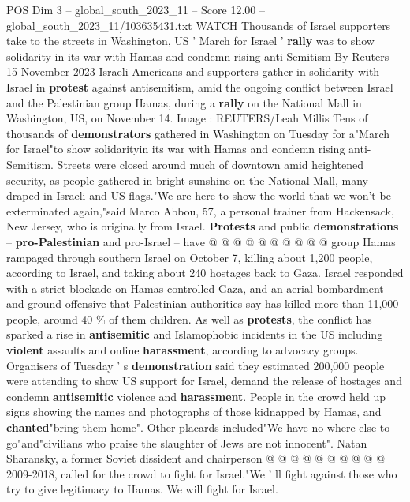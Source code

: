\begin{textsample}{POS Dim 3 – global\_south\_2023\_11 – Score 12.00 – global\_south\_2023\_11/103635431.txt}  \label{ex:f3_pos_350}
WATCH Thousands of Israel supporters take to the streets in Washington, US ' March for Israel ' \textbf{rally} was to show solidarity in its war with Hamas and condemn rising anti-Semitism By Reuters - 15 November 2023 Israeli Americans and supporters gather in solidarity with Israel in \textbf{protest} against antisemitism, amid the ongoing conflict between Israel and the Palestinian group Hamas, during a \textbf{rally} on the National Mall in Washington, US, on November 14.
Image : REUTERS/Leah Millis Tens of thousands of \textbf{demonstrators} gathered in Washington on Tuesday for a"March for Israel"to show solidarityin its war with Hamas and condemn rising anti-Semitism.
Streets were closed around much of downtown amid heightened security, as people gathered in bright sunshine on the National Mall, many draped in Israeli and US flags."We are here to show the world that we won't be exterminated again,"said Marco Abbou, 57, a personal trainer from Hackensack, New Jersey, who is originally from Israel. \textbf{Protests} and public \textbf{demonstrations} -- \textbf{pro-Palestinian} and pro-Israel -- have @ @ @ @ @ @ @ @ @ @ group Hamas rampaged through southern Israel on October 7, killing about 1,200 people, according to Israel, and taking about 240 hostages back to Gaza.
Israel responded with a strict blockade on Hamas-controlled Gaza, and an aerial bombardment and ground offensive that Palestinian authorities say has killed more than 11,000 people, around 40 \% of them children.
As well as \textbf{protests}, the conflict has sparked a rise in \textbf{antisemitic} and Islamophobic incidents in the US including \textbf{violent} assaults and online \textbf{harassment}, according to advocacy groups.
Organisers of Tuesday ' s \textbf{demonstration} said they estimated 200,000 people were attending to show US support for Israel, demand the release of hostages and condemn \textbf{antisemitic} violence and \textbf{harassment}.
People in the crowd held up signs showing the names and photographs of those kidnapped by Hamas, and \textbf{chanted}"bring them home".
Other placards included"We have no where else to go"and"civilians who praise the slaughter of Jews are not innocent".
Natan Sharansky, a former Soviet dissident and chairperson @ @ @ @ @ @ @ @ @ @ 2009-2018, called for the crowd to fight for Israel."We ' ll fight against those who try to give legitimacy to Hamas.
We will fight for Israel.

\end{textsample}
